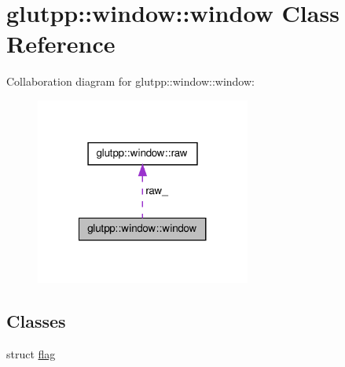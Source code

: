\hypertarget{classglutpp_1_1window_1_1window}{\section{glutpp\-:\-:window\-:\-:window \-Class \-Reference}
\label{classglutpp_1_1window_1_1window}
}


\-Collaboration diagram for glutpp\-:\-:window\-:\-:window\-:
\nopagebreak
\begin{figure}[H]
\begin{center}
\leavevmode
\includegraphics[width=200pt]{classglutpp_1_1window_1_1window__coll__graph}
\end{center}
\end{figure}
\subsection*{\-Classes}
\begin{DoxyCompactItemize}
\item 
struct \hyperlink{structglutpp_1_1window_1_1window_1_1flag}{flag}
\end{DoxyCompactItemize}
